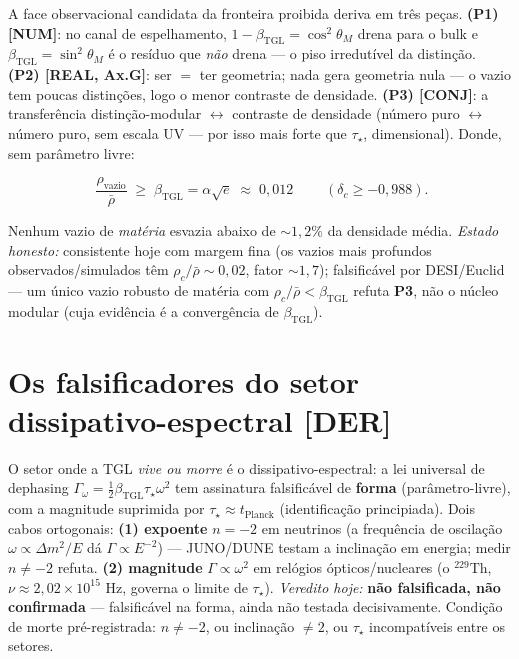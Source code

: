 \documentclass[11pt]{article}
\newcommand{\bTGL}{\beta_{\mathrm{TGL}}}\newcommand{\Msun}{M_{\odot}}\newcommand{\TGL}{\mathrm{TGL}}
\theoremstyle{definition}\newtheorem{deriv}{Derivação}
\begin{document}
A face observacional candidata da fronteira proibida deriva em três peças. \textbf{(P1) \textsf{[NUM]}}: no canal de espelhamento, $1-\bTGL=\cos^2\theta_M$ drena para o bulk e $\bTGL=\sin^2\theta_M$ é o resíduo que \emph{não} drena --- o piso irredutível da distinção. \textbf{(P2) \textsf{[REAL, Ax.G]}}: ser $=$ ter geometria; nada gera geometria nula --- o vazio tem poucas distinções, logo o menor contraste de densidade. \textbf{(P3) \textsf{[CONJ]}}: a transferência distinção-modular $\leftrightarrow$ contraste de densidade (número puro $\leftrightarrow$ número puro, sem escala UV --- por isso mais forte que $\tau_\star$, dimensional). Donde, sem parâmetro livre:

\begin{equation}\boxed{\;\frac{\rho_{\mathrm{vazio}}}{\bar\rho}\;\geq\;\bTGL=\alpha\sqrt{e}\;\approx\;0{,}012\;}\qquad(\delta_c\geq-0{,}988).\end{equation}

Nenhum vazio de \emph{matéria} esvazia abaixo de $\sim1{,}2\%$ da densidade média. \emph{Estado honesto:} consistente hoje com margem fina (os vazios mais profundos observados/simulados têm $\rho_c/\bar\rho\sim0{,}02$, fator $\sim1{,}7$); falsificável por DESI/Euclid --- um único vazio robusto de matéria com $\rho_c/\bar\rho<\bTGL$ refuta \textbf{P3}, não o núcleo modular (cuja evidência é a convergência de $\bTGL$).

\section{Os falsificadores do setor dissipativo-espectral \textsf{[DER]}}

O setor onde a TGL \emph{vive ou morre} é o dissipativo-espectral: a lei universal de dephasing $\Gamma_\omega=\tfrac12\bTGL\tau_\star\omega^2$ tem assinatura falsificável de \textbf{forma} (parâmetro-livre), com a magnitude suprimida por $\tau_\star\approx t_{\mathrm{Planck}}$ (identificação principiada). Dois cabos ortogonais: \textbf{(1) expoente} $n=-2$ em neutrinos (a frequência de oscilação $\omega\propto\Delta m^2/E$ dá $\Gamma\propto E^{-2}$) --- JUNO/DUNE testam a inclinação em energia; medir $n\neq-2$ refuta. \textbf{(2) magnitude} $\Gamma\propto\omega^2$ em relógios ópticos/nucleares (o $^{229}$Th, $\nu\approx2{,}02\times10^{15}$ Hz, governa o limite de $\tau_\star$). \emph{Veredito hoje:} \textbf{não falsificada, não confirmada} --- falsificável na forma, ainda não testada decisivamente. Condição de morte pré-registrada: $n\neq-2$, ou inclinação $\neq2$, ou $\tau_\star$ incompatíveis entre os setores.
\end{document}
